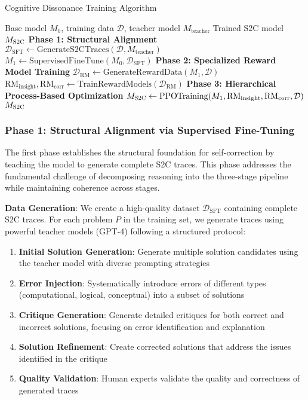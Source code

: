 \documentclass[10pt,twocolumn]{article}
\newcommand{\ssc}{\textsc{S2C}}
\newcommand{\RMinsight}{\text{RM}_{\text{insight}}}
\newcommand{\RMcorr}{\text{RM}_{\text{corr}}}
\begin{document}
\begin{algorithm}[H]
\caption{Cognitive Dissonance Training Algorithm}
\label{alg:cdt}
\begin{algorithmic}[1]
\REQUIRE Base model $M_0$, training data $\mathcal{D}$, teacher model $M_{\text{teacher}}$
\ENSURE Trained \ssc{} model $M_{\ssc{}}$
\STATE \textbf{Phase 1: Structural Alignment}
\STATE $\mathcal{D}_{\text{SFT}} \leftarrow \text{GenerateS2CTraces}(\mathcal{D}, M_{\text{teacher}})$
\STATE $M_1 \leftarrow \text{SupervisedFineTune}(M_0, \mathcal{D}_{\text{SFT}})$
\STATE \textbf{Phase 2: Specialized Reward Model Training}
\STATE $\mathcal{D}_{\text{RM}} \leftarrow \text{GenerateRewardData}(M_1, \mathcal{D})$
\STATE $\RMinsight, \RMcorr \leftarrow \text{TrainRewardModels}(\mathcal{D}_{\text{RM}})$
\STATE \textbf{Phase 3: Hierarchical Process-Based Optimization}
\STATE $M_{\ssc{}} \leftarrow \text{PPOTraining}(M_1, \RMinsight, \RMcorr, \mathcal{D})$
\RETURN $M_{\ssc{}}$
\end{algorithmic}
\end{algorithm}

\subsubsection{Phase 1: Structural Alignment via Supervised Fine-Tuning}

The first phase establishes the structural foundation for self-correction by teaching the model to generate complete \ssc{} traces. This phase addresses the fundamental challenge of decomposing reasoning into the three-stage pipeline while maintaining coherence across stages.

\textbf{Data Generation}: We create a high-quality dataset $\mathcal{D}_{\text{SFT}}$ containing complete \ssc{} traces. For each problem $P$ in the training set, we generate traces using powerful teacher models (GPT-4) following a structured protocol:

\begin{enumerate}[leftmargin=*]
\item \textbf{Initial Solution Generation}: Generate multiple solution candidates using the teacher model with diverse prompting strategies
\item \textbf{Error Injection}: Systematically introduce errors of different types (computational, logical, conceptual) into a subset of solutions
\item \textbf{Critique Generation}: Generate detailed critiques for both correct and incorrect solutions, focusing on error identification and explanation
\item \textbf{Solution Refinement}: Create corrected solutions that address the issues identified in the critique
\item \textbf{Quality Validation}: Human experts validate the quality and correctness of generated traces
\end{enumerate}
\end{document}
